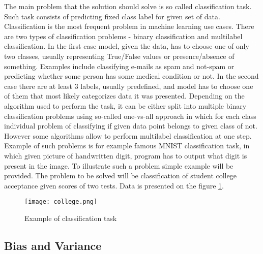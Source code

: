 \documentclass[a4paper,twoside,12pt]{book}
\begin{document}
The main problem that the solution should solve is so called classification task. Such task consists of predicting fixed class label for given set of data. Classification is the most frequent problem in machine learning use cases. There are two types of classification problems - binary classification and multilabel classification.
In the first case model, given the data, has to choose one of only two classes, usually representing True/False values or presence/absence of something. Examples include classifying e-mails as spam and not-spam or predicting whether some person has some medical condition or not.
In the second case there are at least 3 labels, usually predefined, and model has to choose one of them that most likely categorizes data it was presented. Depending on the algorithm used to perform the task, it can be either split into multiple binary classification problems using so-called one-vs-all approach in which for each class individual problem of classifying if given data point belongs to given class of not. However some algorithms allow to perform multilabel classification at one step. Example of such problems is for example famous MNIST\cite{deng2012mnist} classification task, in which given picture of handwritten digit, program has to output what digit is present in the image.
To illustrate such a problem simple example will be provided. The problem to be solved will be classification of student college acceptance given scores of two tests. Data is presented on the figure \ref{fig:class_task}.


\begin{figure}[h]
    \centering
    \texttt{[image: college.png]}
    \caption{Example of classification task}
    \label{fig:class_task}
\end{figure}


\subsection{Bias and Variance}
\end{document}
